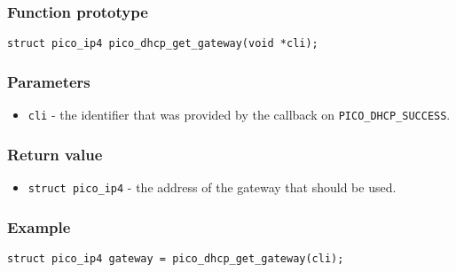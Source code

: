 \subsubsection*{Function prototype}
\texttt{struct pico\_ip4 pico\_dhcp\_get\_gateway(void *cli);}

\subsubsection*{Parameters}
\begin{itemize}[noitemsep]
\item \texttt{cli} - the identifier that was provided by the callback on \texttt{PICO\_DHCP\_SUCCESS}.
\end{itemize}

\subsubsection*{Return value}
\begin{itemize}[noitemsep]
\item \texttt{struct pico\_ip4} - the address of the gateway that should be used. 
\end{itemize}


\subsubsection*{Example}
\begin{verbatim}
struct pico_ip4 gateway = pico_dhcp_get_gateway(cli);
\end{verbatim}
